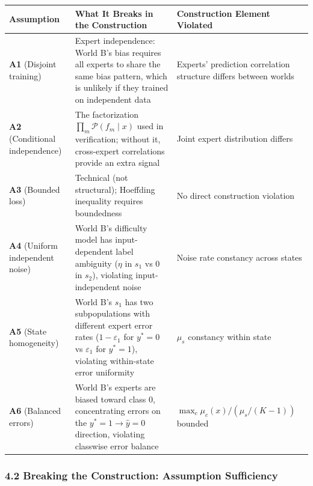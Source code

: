 \documentclass[
  12pt,
]{ctexart}
\begin{document}
\begin{longtable}[]{@{}
  >{\raggedright\arraybackslash}p{}
  >{\raggedright\arraybackslash}p{}
  >{\raggedright\arraybackslash}p{}@{}}
\toprule\noalign{}
\begin{minipage}[b]{\linewidth}\raggedright
Assumption
\end{minipage} & \begin{minipage}[b]{\linewidth}\raggedright
What It Breaks in the Construction
\end{minipage} & \begin{minipage}[b]{\linewidth}\raggedright
Construction Element Violated
\end{minipage} \\
\midrule\noalign{}
\endhead
\bottomrule\noalign{}
\endlastfoot
\textbf{A1} (Disjoint training) & Expert independence: World B's bias
requires all experts to share the same bias pattern, which is unlikely
if they trained on independent data & Experts' prediction correlation
structure differs between worlds \\
\textbf{A2} (Conditional independence) & The factorization
\(\prod_m \mathcal{P}(f_m \mid x)\) used in verification; without it,
cross-expert correlations provide an extra signal & Joint expert
distribution differs \\
\textbf{A3} (Bounded loss) & Technical (not structural); Hoeffding
inequality requires boundedness & No direct construction violation \\
\textbf{A4} (Uniform independent noise) & World B's difficulty model has
input-dependent label ambiguity (\(\eta\) in \(s_1\) vs \(0\) in
\(s_2\)), violating input-independent noise & Noise rate constancy
across states \\
\textbf{A5} (State homogeneity) & World B's \(s_1\) has two
subpopulations with different expert error rates (\(1-\varepsilon_1\)
for \(y^*=0\) vs \(\varepsilon_1\) for \(y^*=1\)), violating
within-state error uniformity & \(\mu_s\) constancy within state \\
\textbf{A6} (Balanced errors) & World B's experts are biased toward
class 0, concentrating errors on the \(y^*=1 \to \hat{y}=0\) direction,
violating classwise error balance & \(\max_c \mu_c(x) / (\mu_s/(K-1))\)
bounded \\
\end{longtable}

\subsubsection{4.2 Breaking the Construction: Assumption
Sufficiency}\label{breaking-the-construction-assumption-sufficiency}
\end{document}
